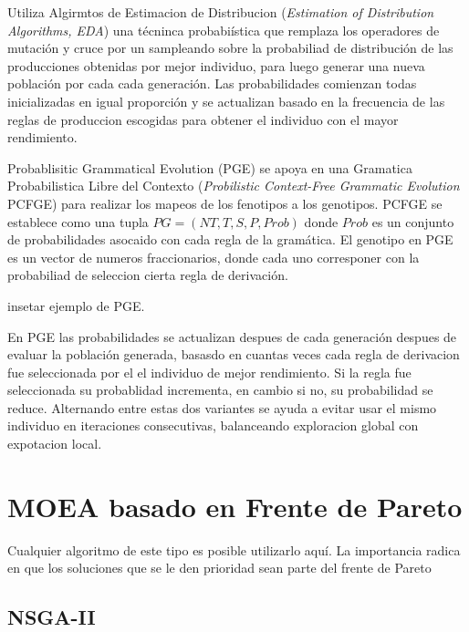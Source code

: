 
Utiliza Algirmtos de Estimacion de Distribucion (\textit{Estimation of Distribution Algorithms, EDA}) una t\'ecninca probabi\'istica que remplaza los operadores de mutaci\'on y cruce por un sampleando sobre la probabiliad de distribuci\'on de las producciones obtenidas por mejor individuo, para luego generar una nueva poblaci\'on por cada cada generaci\'on. Las probabilidades comienzan todas inicializadas en igual proporci\'on  y se actualizan basado en la frecuencia de las reglas de produccion escogidas para obtener el individuo con el mayor rendimiento.

Probablisitic Grammatical Evolution (PGE)  se apoya en una Gramatica Probabilistica Libre del Contexto (\textit{Probilistic Context-Free Grammatic Evolution} PCFGE) para realizar los mapeos de los fenotipos a los genotipos. PCFGE se establece como una tupla $PG = (NT, T, S, P, Prob)$ donde $Prob$  es un conjunto de probabilidades asocaido con cada regla de la gram\'atica. El genotipo en PGE es un vector de numeros fraccionarios, donde cada uno corresponer con la probabiliad de seleccion cierta regla de derivaci\'on.

insetar ejemplo de PGE.

En PGE las probabilidades se actualizan despues de cada generaci\'on  despues de evaluar la poblaci\'on generada, basasdo en cuantas veces cada regla de derivacion fue seleccionada por el el individuo de mejor rendimiento. Si la regla fue seleccionada su probablidad incrementa, en cambio si no, su probabilidad se reduce. Alternando entre estas dos variantes se ayuda a evitar usar el mismo individuo en iteraciones consecutivas, balanceando exploracion global con expotacion local.

\section{MOEA basado en Frente de Pareto}

Cualquier algoritmo de este tipo es posible utilizarlo aqu\'i. La importancia radica en que los soluciones que se le den prioridad sean parte del frente de Pareto

\subsection{NSGA-II}

